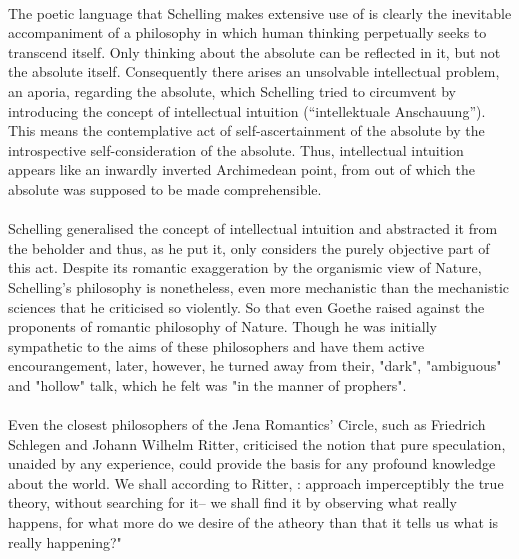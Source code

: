 \documentclass[9pt,a4paper,twocolumn]{article}
\newcounter{theo}
\begin{document}
            \\
            The poetic language that Schelling makes extensive use of is clearly the inevitable accompaniment of a philosophy in which human thinking perpetually seeks to transcend itself. Only thinking about the absolute can be reflected in it, but not the absolute itself. Consequently there arises an unsolvable intellectual problem, an aporia, regarding the absolute, which Schelling tried to circumvent by introducing the concept of intellectual intuition (“intellektuale Anschauung”). This means the contemplative act of self-ascertainment of the absolute by the introspective self-consideration of the absolute. Thus, intellectual intuition appears like an inwardly inverted Archimedean point, from out of which the absolute was supposed to be made comprehensible.
            \\
            \\
            Schelling generalised the concept of intellectual intuition and abstracted it from the beholder and thus, as he put it, only considers the purely objective part of this act. Despite its romantic exaggeration by the organismic view of Nature, Schelling's philosophy is nonetheless, even more mechanistic than the mechanistic sciences that he criticised so violently. So that even Goethe raised against the proponents of romantic philosophy of Nature. Though he was initially sympathetic to the aims of these philosophers and have them active encourangement, later, however, he turned away from their, "dark", "ambiguous" and "hollow" talk, which he felt was "in the manner of prophers".
            \\
            \\
            Even the closest philosophers of the Jena Romantics' Circle, such as Friedrich Schlegen and Johann Wilhelm Ritter, criticised the notion that pure speculation, unaided by any experience, could provide the basis for any profound knowledge about the world. We shall according to Ritter, : approach imperceptibly the true theory, without searching for it-- we shall find it by observing what really happens, for what more do we desire of the atheory than that it tells us what is really happening?"\cite{Kuppers2018-vv}


        
        
        
        
        
        
        
        
        
        
        
        \newpage
        
        
\end{document}
